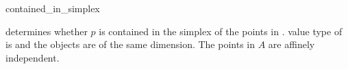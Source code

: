 \begin{ccRefFunction}{contained_in_simplex}
\ccHtmlNoLinks

{determines whether $p$ is contained in the simplex
of the points in \ccc{A = tuple [first,last)}.
\ccPrecond value type of  is 
and the objects are of the same dimension. The points in $A$ are
affinely independent.}

\end{ccRefFunction}

